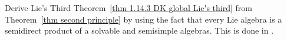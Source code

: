 
Derive Lie's Third Theorem~\ref{thm 1.14.3 DK global Lie's third} from Theorem~\ref{thm second principle} by using the fact that every Lie algebra is a semidirect product of a solvable and semisimple algebras. This is done in \cite[Rem.~9.5.12]{HN}.


